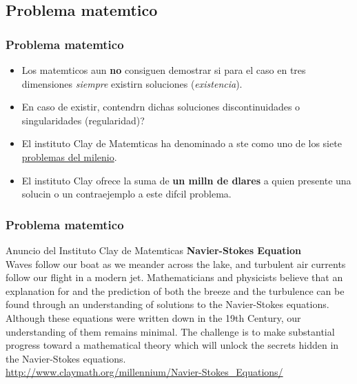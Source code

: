 \documentclass[serif,9pt]{beamer}
\begin{document}
\subsection{Problema matemtico}
\begin{frame}\frametitle{Problema matemtico} 

\begin{itemize}
\item Los matemticos aun \textbf{no} consiguen demostrar si para el caso en tres dimensiones
\textit{siempre} existirn soluciones (\textit{existencia}).  \pause
\bigskip

\item En caso de existir, contendrn dichas soluciones discontinuidades o singularidades (regularidad)?  \pause
\bigskip

\item El instituto Clay de Matemticas ha denominado a ste como uno de los siete \href{http://www.claymath.org/millennium/}{problemas del milenio}. \pause

\bigskip

\item El instituto Clay ofrece la suma de \textbf{un milln de dlares} a quien presente una solucin o un contraejemplo a 
este difcil problema.
\end{itemize}

\end{frame}

\begin{frame}\frametitle{Problema matemtico}



\vspace{-1cm} %

\begin{exampleblock}{Anuncio del Instituto Clay de Matemticas}
\medskip
\textbf{Navier-Stokes Equation}\\ 
\medskip
Waves follow our boat as we meander across the lake, and turbulent air
currents follow our flight in a modern jet. Mathematicians and physicists
believe that an explanation for and the prediction of both the breeze and
the turbulence can be found through an understanding of solutions to the
Navier-Stokes equations. Although these equations were written down
in the 19th Century, our understanding of them remains minimal. The
challenge is to make substantial progress toward a mathematical theory
which will unlock the secrets hidden in the Navier-Stokes equations.\\ 
\medskip
\href{http://www.claymath.org/millennium/Navier-Stokes\_Equations/}{http://www.claymath.org/millennium/Navier-Stokes\_Equations/}
\end{exampleblock}

\end{frame}
\end{document}
